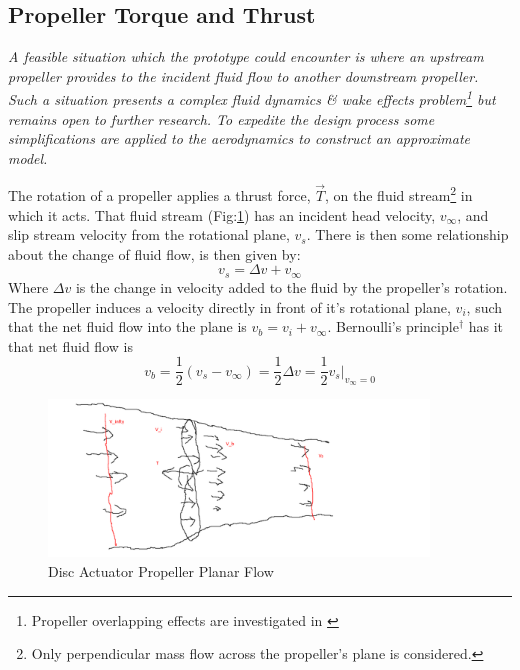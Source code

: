 \subsection{Propeller Torque and Thrust}
\label{subsec:dynamics.aero.bem}
\emph{\color{Gray} A feasible situation which the prototype could encounter is where an upstream propeller provides to the incident fluid flow to another downstream propeller. Such a situation presents a complex fluid dynamics \& wake effects problem\footnote{Propeller overlapping effects are investigated in \cite{configurationpropulsion}} but remains open to further research. To expedite the design process some simplifications are applied to the aerodynamics to construct an approximate model.}
\par
The rotation of a propeller applies a thrust force, $\vec{T}$, on the fluid stream\footnote{Only perpendicular mass flow across the propeller's plane is considered.} in which it acts. That fluid stream (Fig:\ref{fig:bem-flow}) has an incident head velocity, $v_\infty$, and slip stream velocity from the rotational plane, $v_s$. There is then some relationship about the change of fluid flow, is then given by:
\begin{equation}
v_ s = \Delta v + v_\infty
\end{equation}
Where $\Delta v$ is the change in velocity added to the fluid by the propeller's rotation. The propeller induces a velocity directly in front of it's rotational plane, $v_i$, such that the net fluid flow into the plane is $v_b=v_i+v_\infty$. Bernoulli's principle$^{\dagger}$ has it that net fluid flow is
\begin{equation}\label{eq:bernoulli}
v_b = \frac{1}{2} ( v_s - v_{\infty} ) = \frac{1}{2} \Delta v = \frac{1}{2} v_s \big|_{v_\infty=0}
\end{equation}
\begin{figure}[htbp]
\centering
\includegraphics[width=0.9\textwidth]{figs/bem-flow}
\caption{Disc Actuator Propeller Planar Flow}
\label{fig:bem-flow}
\end{figure}
